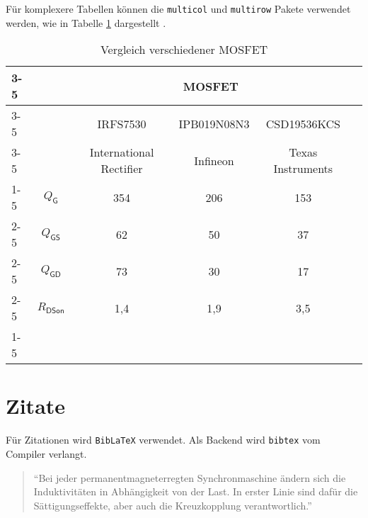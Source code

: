 Für komplexere Tabellen können die \verb|multicol| und \verb|multirow| Pakete verwendet werden, wie in Tabelle \ref{tab:vgl_mosfet} dargestellt \cite{dalton}.
\begin{table}[h]
		\centering
	\renewcommand{\arraystretch}{1.6}
\begin{tabular}{lc|c|c|c|l}
	\cline{3-5}
	& \multicolumn{1}{l|}{} & \multicolumn{3}{c|}{MOSFET}             &  \\ \cline{3-5}
	& \multicolumn{1}{l|}{} & IRFS7530       & IPB019N08N3 & CSD19536KCS &  \\ \cline{3-5}
	& \multicolumn{1}{l|}{} & International Rectifier       & Infineon & Texas Instruments &  \\ \cline{1-5}
	
	\multicolumn{1}{|l|}{\multirow{4}{*}{\begin{turn}{90}Parameter\end{turn}}} & $Q_{\mathsf{G}}$                    &   354 \nano\coulomb             &  206 \nano\coulomb           &   153 \nano\coulomb      &  \\ \cline{2-5}
	\multicolumn{1}{|l|}{}                                                           & $Q_{\mathsf{GS}}$                   &  62 \nano\coulomb             &  50 \nano\coulomb          &  37 \nano\coulomb       &  \\ \cline{2-5}
	\multicolumn{1}{|l|}{}                                                           & $Q_{\mathsf{GD}}$                   & 73 \nano\coulomb              &  30 \nano\coulomb           &  17 \nano\coulomb       &  \\ \cline{2-5}
	\multicolumn{1}{|l|}{}                                                           & $R_{\mathsf{DSon}}$                 & 1,4 \milli\ohm & 1,9 \milli\ohm            &  3,5 \milli\ohm        &  \\ \cline{1-5}
\end{tabular}
	
	\caption{Vergleich verschiedener MOSFET \cite{dalton}}
	\label{tab:vgl_mosfet}
\end{table}
\FloatBarrier

\section{Zitate}\label{sec:cite}
Für Zitationen wird \verb|BibLaTeX| verwendet. Als Backend wird \verb|bibtex| vom Compiler verlangt.


\begin{quote}
\enquote{Bei jeder permanentmagneterregten Synchronmaschine ändern sich die Induktivitäten in Abhängigkeit von der Last. In erster Linie sind dafür die Sättigungseffekte, aber auch die Kreuzkopplung verantwortlich.} 
\end{quote}

